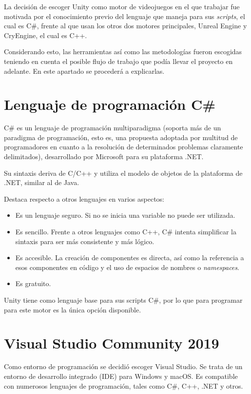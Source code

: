 La decisión de escoger Unity como motor de videojuegos en el que trabajar fue motivada por el conocimiento previo del lenguaje que maneja para sus \textit{scripts}, el cual es C\#, frente al que usan los otros dos motores principales, Unreal Engine y CryEngine, el cual es C++.

Considerando esto, las herramientas así como las metodologías fueron escogidas teniendo en cuenta el posible flujo de trabajo que podía llevar el proyecto en adelante. En este apartado se procederá a explicarlas.

\section{Lenguaje de programación C\#}

C\# es un lenguaje de programación multiparadigma (soporta más de un paradigma de programación, esto es, una propuesta adoptada por multitud de programadores en cuanto a la resolución de determinados problemas claramente delimitados), desarrollado por Microsoft para su plataforma .NET.

Su sintaxis deriva de C/C++ y utiliza el modelo de objetos de la plataforma de .NET, similar al de Java.

Destaca respecto a otros lenguajes en varios aspectos:
\begin{itemize}
\tightlist
    \item Es un lenguaje seguro. Si no se inicia una variable no puede ser utilizada.
    \item Es sencillo. Frente a otros lenguajes como C++, C\# intenta simplificar la sintaxis para ser más consistente y más lógico.
    \item Es accesible. La creación de componentes es directa, así como la referencia a esos componentes en código y el uso de espacios de nombres o \textit{namespaces}.
    \item Es gratuito.
\end{itemize}

Unity tiene como lenguaje base para sus scripts C\#, por lo que para programar para este motor es la única opción disponible.

\section{Visual Studio Community 2019}

Como entorno de programación se decidió escoger Visual Studio. Se trata de un entorno de desarrollo integrado (IDE) para Windows y macOS. Es compatible con numerosos lenguajes de programación, tales como C\#, C++, .NET y otros. 


